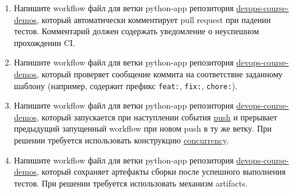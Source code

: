 \documentclass[12pt,a4paper]{article}
\begin{document}
\begin{enumerate}
    \href{https://docs.github.com/en/actions/reference/workflows-and-actions/workflow-syntax#jobsjob_idstrategymatrix}{matrix}.
    \item Напишите workflow файл для ветки python-app репозитория \href{https://github.com/prafdin/devops-course-demos}{devops-course-demos},
    который автоматически комментирует pull request при падении тестов.
    Комментарий должен содержать уведомление о неуспешном прохождении CI.
    \item Напишите workflow файл для ветки python-app репозитория \href{https://github.com/prafdin/devops-course-demos}{devops-course-demos},
    который проверяет сообщение коммита на
    соответствие заданному шаблону (например, содержит префикс \texttt{feat:}, \texttt{fix:}, \texttt{chore:}).
    \item Напишите workflow файл для ветки python-app репозитория \href{https://github.com/prafdin/devops-course-demos}{devops-course-demos},
    который запускается при наступлении события
    \href{https://docs.github.com/en/actions/reference/workflows-and-actions/events-that-trigger-workflows#push}{push} и
    прерывает предыдущий запущенный workflow при новом push в ту же ветку. При решении требуется использовать конструкцию
    \href{https://docs.github.com/en/actions/reference/workflows-and-actions/workflow-syntax#concurrency}{concurrency}.
    \item Напишите workflow файл для ветки python-app репозитория \href{https://github.com/prafdin/devops-course-demos}{devops-course-demos}, который сохраняет артефакты сборки после успешного
    выполнения тестов. При решении требуется использовать механизм artifacts.
\end{enumerate}
\end{document}
